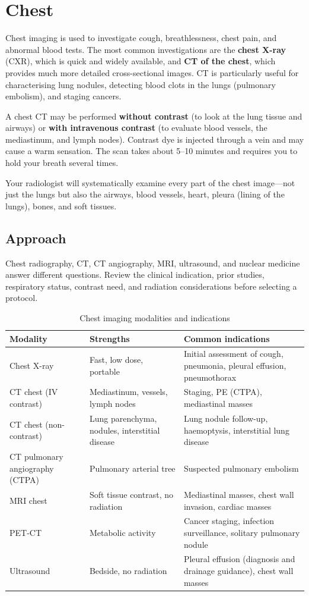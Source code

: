 \chapter{Chest}

\label{ch:ch41_chest}

Chest imaging is used to investigate cough, breathlessness, chest pain, and abnormal blood tests. The most common investigations are the \textbf{chest X-ray} (CXR), which is quick and widely available, and \textbf{CT of the chest}, which provides much more detailed cross-sectional images. CT is particularly useful for characterising lung nodules, detecting blood clots in the lungs (pulmonary embolism), and staging cancers.

A chest CT may be performed \textbf{without contrast} (to look at the lung tissue and airways) or \textbf{with intravenous contrast} (to evaluate blood vessels, the mediastinum, and lymph nodes). Contrast dye is injected through a vein and may cause a warm sensation. The scan takes about 5--10 minutes and requires you to hold your breath several times.

Your radiologist will systematically examine every part of the chest image---not just the lungs but also the airways, blood vessels, heart, pleura (lining of the lungs), bones, and soft tissues.


\section{Approach}
Chest radiography, CT, CT angiography, MRI, ultrasound, and nuclear medicine answer different questions. Review the clinical indication, prior studies, respiratory status, contrast need, and radiation considerations before selecting a protocol.

\begin{table}[h]
\centering
\caption{Chest imaging modalities and indications}
\begin{tabular}{p{3cm} p{5cm} p{5cm}}
\hline
\textbf{Modality} & \textbf{Strengths} & \textbf{Common indications} \\
\hline
Chest X-ray & Fast, low dose, portable & Initial assessment of cough, pneumonia, pleural effusion, pneumothorax \\
CT chest (IV contrast) & Mediastinum, vessels, lymph nodes & Staging, PE (CTPA), mediastinal masses \\
CT chest (non-contrast) & Lung parenchyma, nodules, interstitial disease & Lung nodule follow-up, haemoptysis, interstitial lung disease \\
CT pulmonary angiography (CTPA) & Pulmonary arterial tree & Suspected pulmonary embolism \\
MRI chest & Soft tissue contrast, no radiation & Mediastinal masses, chest wall invasion, cardiac masses \\
PET-CT & Metabolic activity & Cancer staging, infection surveillance, solitary pulmonary nodule \\
Ultrasound & Bedside, no radiation & Pleural effusion (diagnosis and drainage guidance), chest wall masses \\
\hline
\end{tabular}
\end{table}


